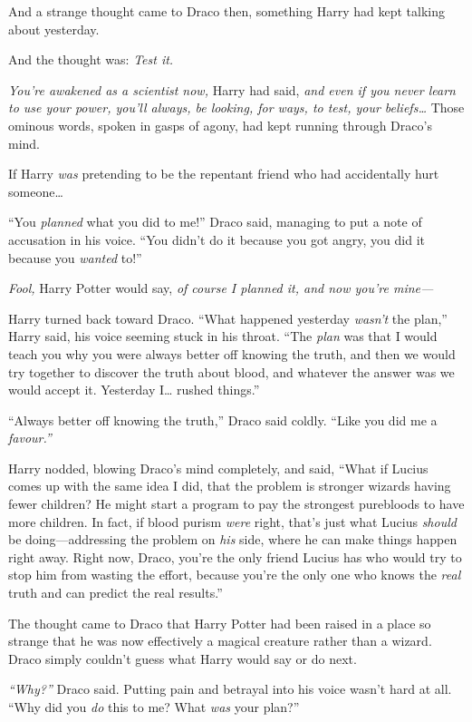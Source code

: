 And a strange thought came to Draco then, something Harry had kept
talking about yesterday.

And the thought was: \emph{Test it.}

\emph{You're awakened as a scientist now,} Harry had said, \emph{and
even if you never learn to use your power, you'll always, be looking,
for ways, to test, your beliefs\ldots{}} Those ominous words, spoken in
gasps of agony, had kept running through Draco's mind.

If Harry \emph{was} pretending to be the repentant friend who had
accidentally hurt someone\ldots{}

``You \emph{planned} what you did to me!'' Draco said, managing to put a
note of accusation in his voice. ``You didn't do it because you got
angry, you did it because you \emph{wanted} to!''

\emph{Fool,} Harry Potter would say, \emph{of course I planned it, and
now you're mine---}

Harry turned back toward Draco. ``What happened yesterday \emph{wasn't}
the plan,'' Harry said, his voice seeming stuck in his throat. ``The
\emph{plan} was that I would teach you why you were always better off
knowing the truth, and then we would try together to discover the truth
about blood, and whatever the answer was we would accept it. Yesterday
I\ldots{} rushed things.''

``Always better off knowing the truth,'' Draco said coldly. ``Like you
did me a \emph{favour.''}

Harry nodded, blowing Draco's mind completely, and said, ``What if
Lucius comes up with the same idea I did, that the problem is stronger
wizards having fewer children? He might start a program to pay the
strongest purebloods to have more children. In fact, if blood purism
\emph{were} right, that's just what Lucius \emph{should} be
doing---addressing the problem on \emph{his} side, where he can make
things happen right away. Right now, Draco, you're the only friend
Lucius has who would try to stop him from wasting the effort, because
you're the only one who knows the \emph{real} truth and can predict the
real results.''

The thought came to Draco that Harry Potter had been raised in a place
so strange that he was now effectively a magical creature rather than a
wizard. Draco simply couldn't guess what Harry would say or do next.

\emph{``Why?''} Draco said. Putting pain and betrayal into his voice
wasn't hard at all. ``Why did you \emph{do} this to me? What \emph{was}
your plan?''

